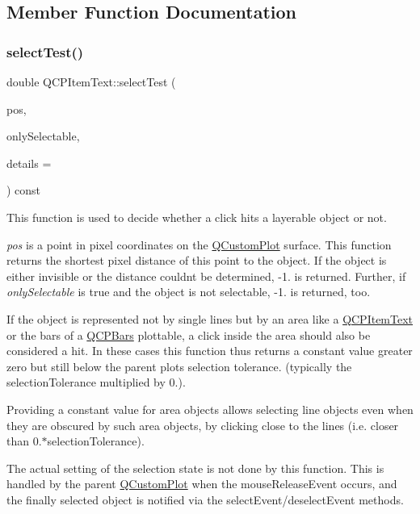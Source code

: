 \subsection{Member Function Documentation}
\mbox{\label{classQCPItemText_a676aaec10ad3cc4d7d0e4847db04c838}} 
\subsubsection{\texorpdfstring{select\+Test()}{selectTest()}}
{\footnotesize\ttfamily double Q\+C\+P\+Item\+Text\+::select\+Test (\begin{DoxyParamCaption}\item[{const Q\+PointF \&}]{pos,  }\item[{bool}]{only\+Selectable,  }\item[{Q\+Variant $\ast$}]{details = {} }\end{DoxyParamCaption}) const\hspace{0.3cm}{\ttfamily [virtual]}}

This function is used to decide whether a click hits a layerable object or not.

{\itshape pos} is a point in pixel coordinates on the \hyperlink{classQCustomPlot}{Q\+Custom\+Plot} surface. This function returns the shortest pixel distance of this point to the object. If the object is either invisible or the distance couldn\textquotesingle{}t be determined, -\/1. is returned. Further, if {\itshape only\+Selectable} is true and the object is not selectable, -\/1. is returned, too.

If the object is represented not by single lines but by an area like a \hyperlink{classQCPItemText}{Q\+C\+P\+Item\+Text} or the bars of a \hyperlink{classQCPBars}{Q\+C\+P\+Bars} plottable, a click inside the area should also be considered a hit. In these cases this function thus returns a constant value greater zero but still below the parent plot\textquotesingle{}s selection tolerance. (typically the selection\+Tolerance multiplied by 0.).

Providing a constant value for area objects allows selecting line objects even when they are obscured by such area objects, by clicking close to the lines (i.\+e. closer than 0.$\ast$selection\+Tolerance).

The actual setting of the selection state is not done by this function. This is handled by the parent \hyperlink{classQCustomPlot}{Q\+Custom\+Plot} when the mouse\+Release\+Event occurs, and the finally selected object is notified via the select\+Event/deselect\+Event methods.

